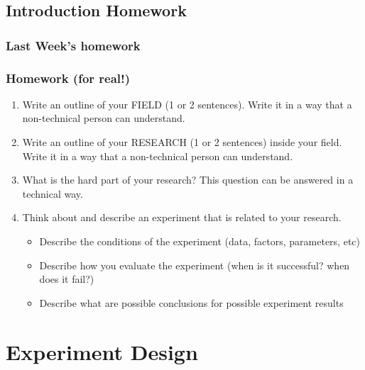 \documentclass{beamer}
\begin{document}
\subsection{Introduction Homework}

\begin{frame}
  \frametitle{Last Week's homework}


  \hspace{1cm}

  
\end{frame}

\begin{frame}
  \frametitle{Homework (for real!)}
    {\small
      \begin{enumerate}
      \item Write an outline of your FIELD (1 or 2 sentences). Write
        it in a way that a non-technical person can understand.

      \item Write an outline of your RESEARCH (1 or 2 sentences)
        inside your field. Write it in a way that a non-technical
        person can understand.


      \item What is the hard part of your research? This question can
        be answered in a technical way.

      \item Think about and describe an experiment that is related to
        your research.
        {\smaller
        \begin{itemize}
        \item Describe the conditions of the experiment (data,
          factors, parameters, etc)
        \item Describe how you evaluate the experiment (when is it
          successful? when does it fail?)
        \item Describe what are possible conclusions for possible experiment results 
        \end{itemize}}
      \end{enumerate}
    }
\end{frame}



\section{Experiment Design}
\end{document}

